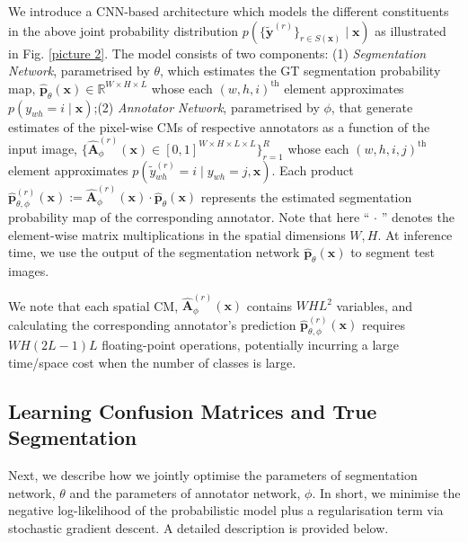 We introduce a CNN-based architecture which models the different constituents in the above joint probability distribution $p(\{\tilde{\textbf{y}}^{(r)}\}_{r\in S(\mathbf{x})}\mid \textbf{x})$ as illustrated in Fig. \ref{picture 2}. The model consists of two components: (1) \textit{Segmentation Network}, parametrised by $\theta$, which estimates the GT segmentation probability map, $\hat{\textbf{p}}_{\theta}(\textbf{x}) \in \mathbb{R}^{W\times H \times L}$ whose each $(w, h, i)^\text{th}$ element approximates $p(y_{wh}=i\mid \textbf{x})$;(2) \textit{Annotator Network}, parametrised by $\phi$, that generate estimates of the pixel-wise CMs of respective annotators as a function of the input image, $\{\hat{\textbf{A}}_{\phi}^{(r)}(\textbf{x})\in [0,1]^{W\times H\times L \times L}\}_{r=1}^{R}$ whose each $(w, h, i, j)^\text{th}$ element approximates $p(\tilde{y}^{(r)}_{wh}=i\mid y_{wh}=j,\textbf{x})$. Each product ${\hat{\textbf{p}}_{\theta, \phi}^{(r)}}(\textbf{x}):=\hat{\textbf{A}}_{\phi}^{(r)}(\textbf{x})\cdot \hat{\textbf{p}}_\theta (\textbf{x})$ represents the estimated segmentation probability map of the corresponding annotator. Note that here ``$\,\cdot\,$'' denotes the element-wise matrix multiplications in the spatial dimensions $W, H$. At inference time, we use the output of the segmentation network ${\hat{\textbf{p}}_\theta }(\textbf{x})$ to segment test images. 

We note that each spatial CM, $\hat{\textbf{A}}_{\phi}^{(r)}(\textbf{x})$ contains $WHL^2$ variables, 
and calculating the corresponding annotator's prediction $\hat{\textbf{p}}_{\theta, \phi}^{(r)}(\textbf{x})$ requires $WH(2L-1)L$ floating-point operations, potentially incurring a large time/space cost when the number of classes is large. 
\subsection{Learning Confusion Matrices and True Segmentation}

Next, we describe how we jointly optimise the parameters of segmentation network, $\theta$ and the parameters of annotator network, $\phi$. In short, we minimise the negative log-likelihood of the probabilistic model plus a regularisation term via stochastic gradient descent. A detailed description is provided below. 

